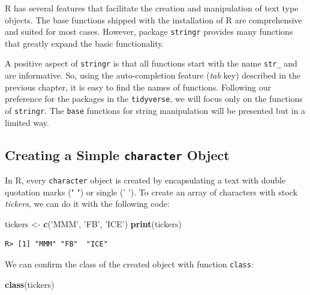 \documentclass[
  12pt,
]{book}
\newenvironment{Shaded}{\begin{snugshade}}{\end{snugshade}}
\newcommand{\KeywordTok}[1]{\textcolor[rgb]{0.27,0.27,0.27}{\textbf{#1}}}
\newcommand{\NormalTok}[1]{#1}
\newcommand{\StringTok}[1]{\textcolor[rgb]{0.5,0.5,0.5}{#1}}
\begin{document}
R has several features that facilitate the creation and manipulation of text type objects. The base functions shipped with the installation of R are comprehensive and suited for most cases. However, package \texttt{stringr} \citep{R-stringr} provides many functions that greatly expand the basic functionality.

A positive aspect of \texttt{stringr} is that all functions start with the name \texttt{str\_} and are informative. So, using the auto-completion feature (\emph{tab} key) described in the previous chapter, it is easy to find the names of functions. Following our preference for the packages in the \texttt{tidyverse}, we will focus only on the functions of \texttt{stringr}. The \texttt{base} functions for string manipulation will be presented but in a limited way. 

\hypertarget{creating-a-simple-character-object}{%
\subsection{\texorpdfstring{Creating a Simple \texttt{character} Object}{Creating a Simple character Object}}\label{creating-a-simple-character-object}}

In R, every \texttt{character} object is created by encapsulating a text with double quotation marks (" ") or single (' '). To create an array of characters with stock \emph{tickers}, we can do it with the following code: 

\begin{Shaded}
\begin{Highlighting}[]
\NormalTok{tickers <-}\StringTok{ }\KeywordTok{c}\NormalTok{(}\StringTok{'MMM'}\NormalTok{, }\StringTok{'FB'}\NormalTok{, }\StringTok{'ICE'}\NormalTok{)}
\KeywordTok{print}\NormalTok{(tickers)}
\end{Highlighting}
\end{Shaded}

\begin{verbatim}
R> [1] "MMM" "FB"  "ICE"
\end{verbatim}

We can confirm the class of the created object with function \texttt{class}: 

\begin{Shaded}
\begin{Highlighting}[]
\KeywordTok{class}\NormalTok{(tickers)}
\end{Highlighting}
\end{Shaded}
\end{document}
